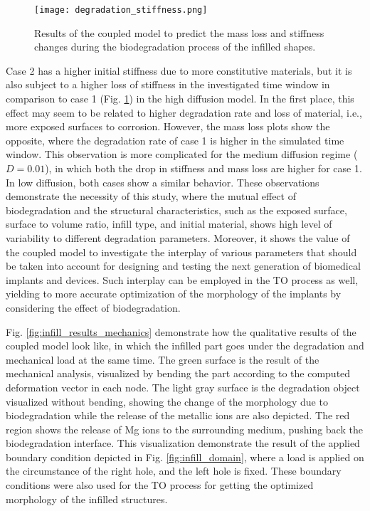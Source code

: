\begin{figure}[h]
\centering
\medskip
\texttt{[image: degradation\_stiffness.png]}
\caption[Results of the coupled model to predict the stiffness changes during biodegradation]{Results of the coupled model to predict the mass loss and stiffness changes during the biodegradation process of the infilled shapes.} \label{fig:infill_degradation_stiffness}
\end{figure}

Case 2 has a higher initial stiffness due to more constitutive materials, but it is also subject to a higher loss of stiffness in the investigated time window in comparison to case 1 (Fig. \ref{fig:infill_degradation_stiffness}) in the high diffusion model. In the first place, this effect may seem to be related to higher degradation rate and loss of material, i.e., more exposed surfaces to corrosion. However, the mass loss plots show the opposite, where the degradation rate of case 1 is higher in the simulated time window. This observation is more complicated for the medium diffusion regime ($D=0.01$), in which both the drop in stiffness and mass loss are higher for case 1. In low diffusion, both cases show a similar behavior. These observations demonstrate the necessity of this study, where the mutual effect of biodegradation and the structural characteristics, such as the exposed surface, surface to volume ratio, infill type, and initial material, shows high level of variability to different degradation parameters. Moreover, it shows the value of the coupled model to investigate the interplay of various parameters that should be taken into account for designing and testing the next generation of biomedical implants and devices. Such interplay can be employed in the TO process as well, yielding to more accurate optimization of the morphology of the implants by considering the effect of biodegradation.

Fig. \ref{fig:infill_results_mechanics} demonstrate how the qualitative results of the coupled model look like, in which the infilled part goes under the degradation and mechanical load at the same time. The green surface is the result of the mechanical analysis, visualized by bending the part according to the computed deformation vector in each node. The light gray surface is the degradation object visualized without bending, showing the change of the morphology due to biodegradation while the release of the metallic ions are also depicted. The red region shows the release of Mg ions to the surrounding medium, pushing back the biodegradation interface. This visualization demonstrate the result of the applied boundary condition depicted in Fig. \ref{fig:infill_domain}, where a load is applied on the circumstance of the right hole, and the left hole is fixed. These boundary conditions were also used for the TO process for getting the optimized morphology of the infilled structures. 


